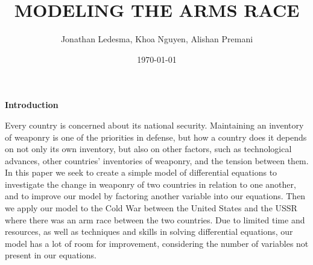 

\title{MODELING THE ARMS RACE}		%


\author{Jonathan Ledesma, Khoa Nguyen, Alishan Premani}					%


\date{\today}				%


\maketitle		%
			

\begin{center}
{\large \bfseries Introduction} %
\end{center}

Every country is concerned about its national security. Maintaining an inventory of weaponry is one of the priorities in defense, but how a country does it depends on not only its own inventory, but also on other factors, such as technological advances, other countries' inventories of weaponry, and the tension between them. In this paper we seek to create a simple model of differential equations to investigate the change in weaponry of two countries in relation to one another, and to improve our model by factoring another variable into our equations. Then we apply our model to the Cold War between the United States and the USSR where there was an arm race between the two countries. Due to limited time and resources, as well as techniques and skills in solving differential equations, our model has a lot of room for improvement, considering the number of variables not present in our equations.

\newpage

